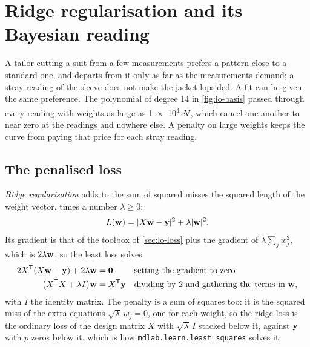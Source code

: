 \section{Ridge regularisation and its Bayesian reading}
\label{sec:lo-ridge}

A tailor cutting a suit from a few measurements prefers a pattern close
to a standard one, and departs from it only as far as the measurements
demand; a stray reading of the sleeve does not make the jacket
lopsided. A fit can be given the same preference. The polynomial of
degree 14 in \cref{fig:lo-basis} passed through every reading with
weights as large as \num{1e4}\,\si{\electronvolt}, which cancel one
another to near zero at the readings and nowhere else. A penalty on large
weights keeps the curve from paying that price for each stray reading.

\subsection*{The penalised loss}

\emph{Ridge regularisation} adds to the sum of squared misses the
squared length of the weight vector, times a number $\lambda \ge 0$:
\begin{equation}
   L(\bm{\mathrm{w}}) = \lvert X\bm{\mathrm{w}} - \bm{\mathrm{y}}\rvert^2 + \lambda\lvert\bm{\mathrm{w}}\rvert^2 .
   \label{eq:lo-ridge}
\end{equation}
Its gradient is that of the toolbox of \cref{sec:lo-loss} plus the
gradient of $\lambda\sum_jw_j^2$, which is $2\lambda\bm{\mathrm{w}}$, so the least
loss solves
\begin{align*}
   2X^{\mathsf T}(X\bm{\mathrm{w}} - \bm{\mathrm{y}}) + 2\lambda\bm{\mathrm{w}} &= \bm{\mathrm{0}}
      && \text{setting the gradient to zero}\\
   \bigl(X^{\mathsf T}X + \lambda I\bigr)\bm{\mathrm{w}} &= X^{\mathsf T}\bm{\mathrm{y}}
      && \text{dividing by 2 and gathering the terms in $\bm{\mathrm{w}}$,}
\end{align*}
with $I$ the identity matrix. The penalty is a sum of squares too: it is
the squared miss of the extra equations $\sqrt\lambda\,w_j = 0$, one for
each weight, so the ridge loss is the ordinary loss of the design matrix
$X$ with $\sqrt\lambda\,I$ stacked below it, against $\bm{\mathrm{y}}$ with $p$
zeros below it, which is how \texttt{mdlab.learn.least\_squares} solves it:

